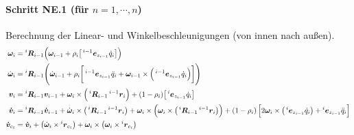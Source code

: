 			\paragraph{Schritt NE.1 (für \( n = 1, \cdots, n \))}
				Berechnung der Linear- und Winkelbeschleunigungen (von innen nach außen).
				\begin{align*}
					\bm{\omega}_i       & = \prescript{i}{}{\bm{R}}_{i - 1} \Big( \bm{\omega}_{i - 1} + \rho_i \big[ \prescript{i - 1}{}{\bm{e}}_{z_{i - 1}} \dot{q}_i \big] \Big)                                                                                                                                                                                                                                                                                                                                          \\
					\dot{\bm{\omega}}_i & = \prescript{i}{}{\bm{R}}_{i - 1} \Bigg( \dot{\bm{\omega}}_{i - 1} + \rho_i \bigg[ \prescript{i - 1}{}{\bm{e}}_{z_{i - 1}} \ddot{q}_i + \bm{\omega}_{i - 1} \times \Big( \prescript{i - 1}{}{\bm{e}}_{z_{i - 1}} \dot{q}_i \Big) \bigg] \Bigg)                                                                                                                                                                                                                                \\
					\bm{v}_i            & = \prescript{i}{}{\bm{R}}_{i - 1} \bm{v}_{i - 1} + \bm{\omega}_i \times \Big( \prescript{i}{}{\bm{R}}_{i - 1} \prescript{i - 1}{}{\bm{r}}_i \Big) + (1 - \rho_i) \big[ \prescript{i}{}{\bm{e}}_{z_{i - 1}} \dot{q}_i \big]                                                                                                                                                                                                                                                 \\
					\bm{\dot{v}}_i      & = \prescript{i}{}{\bm{R}}_{i - 1} \bm{\dot{v}}_{i - 1} + \dot{\bm{\omega}}_i \times \big( \prescript{i}{}{\bm{R}}_{i - 1} \prescript{i - 1}{}{\bm{r}}_i \big) + \bm{\omega}_i \times \Big( \bm{\omega}_i \times \big( \prescript{i}{}{\bm{R}}_{i - 1} \prescript{i - 1}{}{\bm{r}}_i \big) \Big) + (1 - \rho_i) \, \Big[ 2\bm{\omega}_i \times \big( \prescript{i}{}{\bm{e}}_{z_{i - 1}} \dot{q}_i \big) + \prescript{i}{}{\bm{e}}_{z_{i - 1}} \ddot{q}_i \Big] \\
					\bm{\dot{v}}_{c_i}  & = \bm{\dot{v}}_i + \big(\dot{\bm{\omega}}_i \times \prescript{i}{}{\bm{r}}_{c_i}\big) + \bm{\omega}_i \times \big( \bm{\omega}_i \times \prescript{i}{}{\bm{r}}_{c_i} \big)
				\end{align*}

